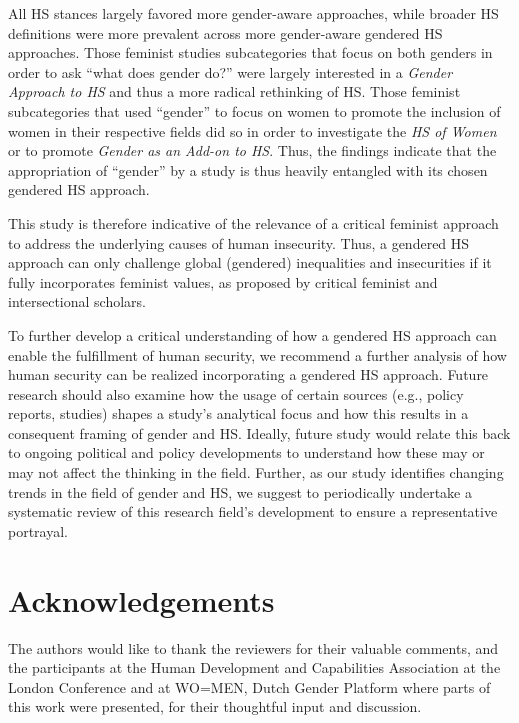\documentclass[10pt,a4paper]{article}
\begin{document}
\begin{multicols}{2}
All HS stances largely favored more gender-aware approaches, while broader HS definitions were more prevalent across more gender-aware gendered HS approaches. Those feminist studies subcategories that focus on both genders in order to ask ``what does gender do?'' were largely interested in a \textit{Gender Approach to HS} and thus a more radical rethinking of HS. Those feminist subcategories that used ``gender'' to focus on women to promote the inclusion of women in their respective fields did so in order to investigate the \textit{HS of Women} or to promote \textit{Gender as an Add-on to HS}. Thus, the findings indicate that the appropriation of ``gender'' by a study is thus heavily entangled with its chosen gendered HS approach.

This study is therefore indicative of the relevance of a critical feminist approach to address the underlying causes of human insecurity. Thus, a gendered HS approach can only challenge global (gendered) inequalities and insecurities if it fully incorporates feminist values, as proposed by critical feminist and intersectional scholars.

To further develop a critical understanding of how a gendered HS approach can enable the fulfillment of human security, we recommend a further analysis of how human security can be realized incorporating a gendered HS approach. Future research should also examine how the usage of certain sources (e.g., policy reports, studies) shapes a study's analytical focus and how this results in a consequent framing of gender and HS. Ideally, future study would relate this back to ongoing political and policy developments to understand how these may or may not affect the thinking in the field. Further, as our study identifies changing trends in the field of gender and HS, we suggest to periodically undertake a systematic review of this research field's development to ensure a representative portrayal.

\section*{Acknowledgements}
The authors would like to thank the reviewers for their valuable comments, and the participants at the Human Development and Capabilities Association at the London Conference and at WO=MEN, Dutch Gender Platform where parts of this work were presented, for their thoughtful input and discussion. 

\end{multicols}
\end{document}
